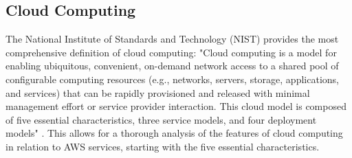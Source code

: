\subsection{Cloud Computing}
The National Institute of Standards and Technology (NIST) provides the most comprehensive definition of cloud computing: "Cloud computing is a model for enabling ubiquitous, convenient, on-demand network access to a shared pool of configurable computing resources (e.g., networks, servers, storage, applications, and services) that can be rapidly provisioned and released with minimal management effort or service provider interaction. This cloud model is composed of five essential characteristics, three service models, and four deployment models" \cite{NISTCloudComputing}. This allows for a thorough analysis of the features of cloud computing in relation to AWS services, starting with the five essential characteristics.
